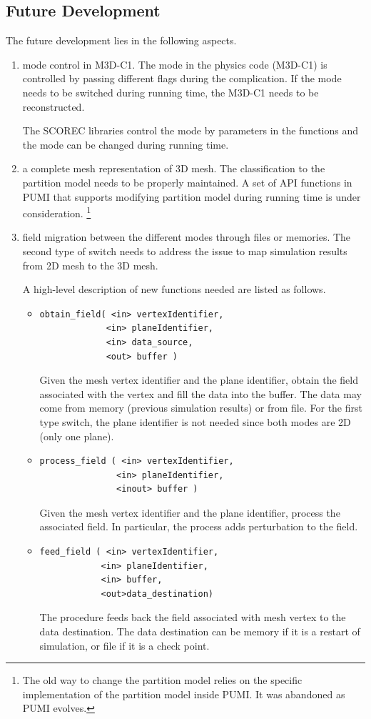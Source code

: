 \documentclass[11pt]{article}  %
\begin{document}
\subsection{Future Development}
The future development lies in the following  aspects. 
\begin{enumerate}
\item mode control in M3D-C1. The mode in the physics code (M3D-C1) is controlled by passing different flags during the complication. If the mode needs to be switched during running time, the M3D-C1 needs to be reconstructed.

The SCOREC libraries control the mode by parameters in the functions and the mode can be changed during running time. 
\item a complete mesh representation of 3D mesh. The classification to the partition model needs to be properly maintained. A set of API functions in PUMI that supports modifying partition model during running time is under consideration. \footnote{The old way to change the partition model relies on the specific implementation of the partition model inside PUMI. It was abandoned as PUMI evolves. } 
\item field migration between the different modes through files or memories. The second type of switch needs to address the issue to map simulation results from 2D mesh to the 3D mesh.

 A high-level description of new functions needed  are listed as follows.
  
\begin{itemize}
\item
\begin{verbatim}
obtain_field( <in> vertexIdentifier,
             <in> planeIdentifier,
             <in> data_source,
             <out> buffer )
\end{verbatim}
Given the mesh vertex identifier and the plane identifier, obtain the field associated with the vertex and fill the data into the buffer. The data may come from memory (previous simulation results) or from file. For the first type switch,  the plane identifier is not needed since both modes are 2D (only one plane). 
\item
\begin{verbatim}
process_field ( <in> vertexIdentifier,
               <in> planeIdentifier,
               <inout> buffer )
\end{verbatim}
 Given the mesh vertex identifier and the plane identifier, process the associated field. In particular, the process adds perturbation to the field.
 \item
\begin{verbatim}  
feed_field ( <in> vertexIdentifier,
            <in> planeIdentifier,
            <in> buffer,
            <out>data_destination)
\end{verbatim}
The procedure feeds back the field associated with mesh vertex to the data destination. The data destination can be  memory if it is a restart of simulation, or file if it is a check point.
\end{itemize}
\end{enumerate}
\end{document}
